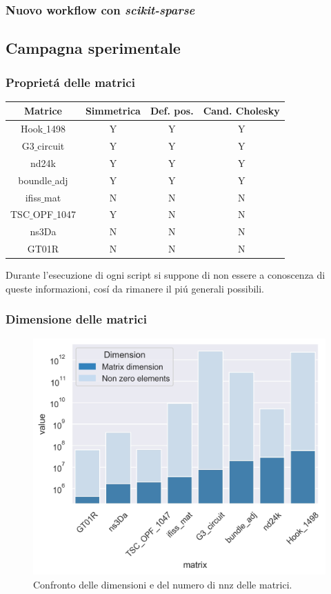 \documentclass{beamer}
\begin{document}
\begin{frame}
\frametitle{Nuovo workflow con \textit{scikit-sparse}}
\end{frame}

\subsection{Campagna sperimentale}

\begin{frame}
\frametitle{Propriet\'a delle matrici}
\begin{table}
\begin{tabular}{c c c c}
\toprule
\textbf{Matrice} & \textbf{Simmetrica} & \textbf{Def. pos.} & \textbf{Cand. Cholesky}\\
\midrule
Hook$\_$1498 & Y & Y & Y\\
 G3$\_$circuit & Y & Y & Y\\
 nd24k & Y & Y & Y\\
 boundle$\_$adj & Y & Y & Y\\
 ifiss$\_$mat & N & N & N\\
 TSC$\_$OPF$\_$1047 & Y & N & N\\
 ns3Da & N & N & N\\
 GT01R & N & N & N \\
\bottomrule
\end{tabular}
\end{table}
Durante l'esecuzione di ogni script si suppone di non essere a conoscenza di queste informazioni, cos\'i da rimanere il pi\'u generali possibili.
\end{frame}

\begin{frame}
	\frametitle{Dimensione delle matrici}
	\begin{figure}
		\includegraphics[width=0.8\textheight]{assets/dimension2.jpg}
		\caption{Confronto delle dimensioni e del numero di nnz delle matrici.}
		\label{fig:dim}
	\end{figure}
\end{frame}
\end{document}
